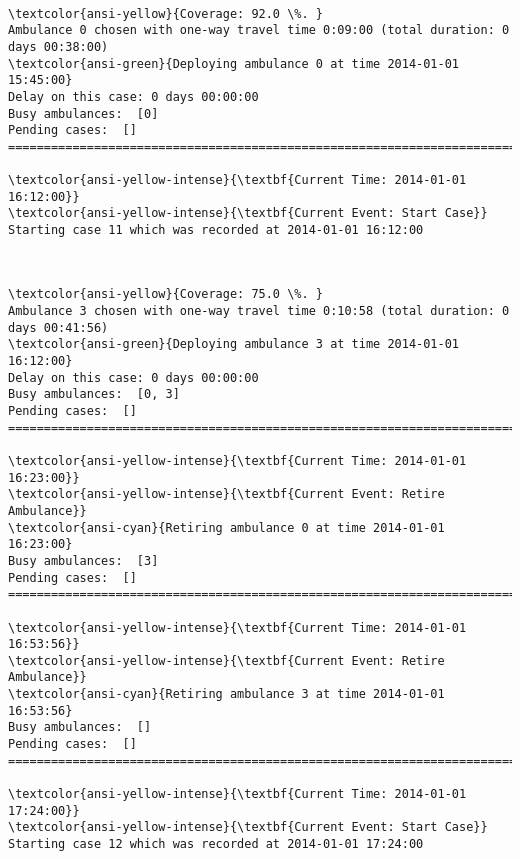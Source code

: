 \documentclass[11pt]{article}
\begin{document}
    \begin{center}
    \end{center}
    { \hspace*{\fill} \\}
    
    \begin{Verbatim}[commandchars=\\\{\}]
\textcolor{ansi-yellow}{Coverage: 92.0 \%. }
Ambulance 0 chosen with one-way travel time 0:09:00 (total duration: 0 days 00:38:00)
\textcolor{ansi-green}{Deploying ambulance 0 at time 2014-01-01 15:45:00}
Delay on this case: 0 days 00:00:00
Busy ambulances:  [0]
Pending cases:  []
========================================================================

\textcolor{ansi-yellow-intense}{\textbf{Current Time: 2014-01-01 16:12:00}}
\textcolor{ansi-yellow-intense}{\textbf{Current Event: Start Case}}
Starting case 11 which was recorded at 2014-01-01 16:12:00

    \end{Verbatim}

    \begin{center}
    \end{center}
    { \hspace*{\fill} \\}
    
    \begin{Verbatim}[commandchars=\\\{\}]
\textcolor{ansi-yellow}{Coverage: 75.0 \%. }
Ambulance 3 chosen with one-way travel time 0:10:58 (total duration: 0 days 00:41:56)
\textcolor{ansi-green}{Deploying ambulance 3 at time 2014-01-01 16:12:00}
Delay on this case: 0 days 00:00:00
Busy ambulances:  [0, 3]
Pending cases:  []
========================================================================

\textcolor{ansi-yellow-intense}{\textbf{Current Time: 2014-01-01 16:23:00}}
\textcolor{ansi-yellow-intense}{\textbf{Current Event: Retire Ambulance}}
\textcolor{ansi-cyan}{Retiring ambulance 0 at time 2014-01-01 16:23:00}
Busy ambulances:  [3]
Pending cases:  []
========================================================================

\textcolor{ansi-yellow-intense}{\textbf{Current Time: 2014-01-01 16:53:56}}
\textcolor{ansi-yellow-intense}{\textbf{Current Event: Retire Ambulance}}
\textcolor{ansi-cyan}{Retiring ambulance 3 at time 2014-01-01 16:53:56}
Busy ambulances:  []
Pending cases:  []
========================================================================

\textcolor{ansi-yellow-intense}{\textbf{Current Time: 2014-01-01 17:24:00}}
\textcolor{ansi-yellow-intense}{\textbf{Current Event: Start Case}}
Starting case 12 which was recorded at 2014-01-01 17:24:00

    \end{Verbatim}
\end{document}
